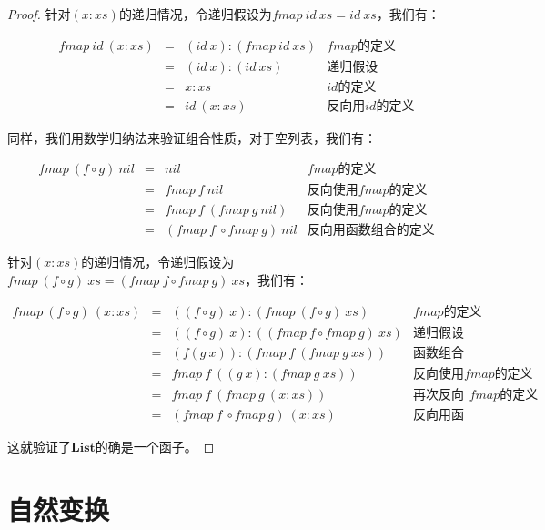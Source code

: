 \documentclass{article}
\begin{document}
\begin{example}
\begin{proof}
针对$(x:xs)$的递归情况，令递归假设为$fmap\ id\ xs = id\ xs$，我们有：

\[
\begin{array}{rcll}
fmap\ id\ (x:xs) & = & (id\ x):(fmap\ id\ xs) & \text{$fmap$的定义} \\
                 & = & (id\ x):(id\ xs) & \text{递归假设} \\
                 & = & x:xs & \text{$id$的定义} \\
                 & = & id\ (x:xs) & \text{反向用$id$的定义}
\end{array}
\]

同样，我们用数学归纳法来验证组合性质，对于空列表，我们有：

\[
\begin{array}{rcll}
fmap\ (f \circ g)\ nil & = & nil & \text{$fmap$的定义} \\
           & = & fmap\ f\ nil & \text{反向使用$fmap$的定义} \\
           & = & fmap\ f\ (fmap\ g\ nil) & \text{反向使用$fmap$的定义} \\
           & = & (fmap\ f\ \circ fmap\ g)\ nil & \text{反向用函数组合的定义}
\end{array}
\]

针对$(x:xs)$的递归情况，令递归假设为$fmap\ (f \circ g)\ xs = (fmap\ f \circ fmap\ g)\ xs$，我们有：

\[
\begin{array}{rcll}
fmap\ (f \circ g)\ (x:xs) & = & ((f \circ g)\ x):(fmap\ (f \circ g)\ xs) & \text{$fmap$的定义} \\
  & = & ((f \circ g)\ x):((fmap\ f \circ fmap\ g)\ xs) & \text{递归假设} \\
  & = & (f(g\ x)):(fmap\ f\ (fmap\ g\ xs)) & \text{函数组合的定义} \\
  & = & fmap\ f\ ((g\ x):(fmap\ g\ xs)) & \text{反向使用$fmap$的定义} \\
  & = & fmap\ f\ (fmap\ g\ (x:xs)) & \text{再次反向使用$fmap$的定义} \\
  & = & (fmap\ f\ \circ fmap\ g)\ (x:xs) & \text{反向用函数组合的定义}
\end{array}
\]

这就验证了$\mathbf{List}$的确是一个函子。
\end{proof}
\end{example}

\section{自然变换}
\end{document}
